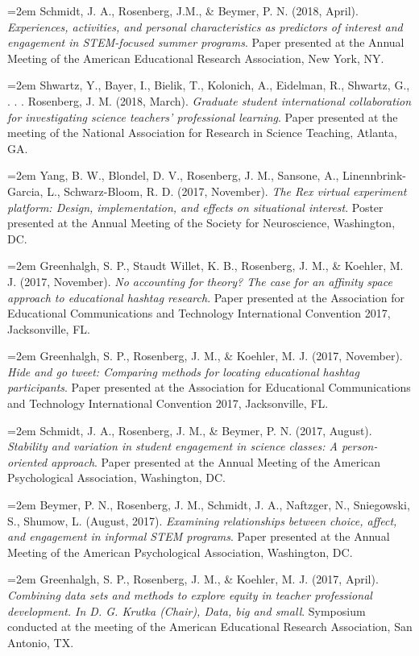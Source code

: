 \documentclass[
  14,
]{article}
\begin{document}
\hangindent=2em Schmidt, J. A., Rosenberg, J.M., \& Beymer, P. N. (2018,
April). \emph{Experiences, activities, and personal characteristics as
predictors of interest and engagement in STEM-focused summer programs}.
Paper presented at the Annual Meeting of the American Educational
Research Association, New York, NY.

\hangindent=2em Shwartz, Y., Bayer, I., Bielik, T., Kolonich, A.,
Eidelman, R., Shwartz, G., . . . Rosenberg, J. M. (2018, March).
\emph{Graduate student international collaboration for investigating
science teachers' professional learning}. Paper presented at the meeting
of the National Association for Research in Science Teaching, Atlanta,
GA.

\hangindent=2em Yang, B. W., Blondel, D. V., Rosenberg, J. M., Sansone,
A., Linennbrink-Garcia, L., Schwarz-Bloom, R. D. (2017, November).
\emph{The Rex virtual experiment platform: Design, implementation, and
effects on situational interest}. Poster presented at the Annual Meeting
of the Society for Neuroscience, Washington, DC.

\hangindent=2em Greenhalgh, S. P., Staudt Willet, K. B., Rosenberg, J.
M., \& Koehler, M. J. (2017, November). \emph{No accounting for theory?
The case for an affinity space approach to educational hashtag
research}. Paper presented at the Association for Educational
Communications and Technology International Convention 2017,
Jacksonville, FL.

\hangindent=2em Greenhalgh, S. P., Rosenberg, J. M., \& Koehler, M. J.
(2017, November). \emph{Hide and go tweet: Comparing methods for
locating educational hashtag participants}. Paper presented at the
Association for Educational Communications and Technology International
Convention 2017, Jacksonville, FL.

\hangindent=2em Schmidt, J. A., Rosenberg, J. M., \& Beymer, P. N.
(2017, August). \emph{Stability and variation in student engagement in
science classes: A person-oriented approach}. Paper presented at the
Annual Meeting of the American Psychological Association, Washington,
DC.

\hangindent=2em Beymer, P. N., Rosenberg, J. M., Schmidt, J. A.,
Naftzger, N., Sniegowski, S., Shumow, L. (August, 2017). \emph{Examining
relationships between choice, affect, and engagement in informal STEM
programs}. Paper presented at the Annual Meeting of the American
Psychological Association, Washington, DC.

\hangindent=2em Greenhalgh, S. P., Rosenberg, J. M., \& Koehler, M. J.
(2017, April). \emph{Combining data sets and methods to explore equity
in teacher professional development. In D. G. Krutka (Chair), Data, big
and small}. Symposium conducted at the meeting of the American
Educational Research Association, San Antonio, TX.
\end{document}
